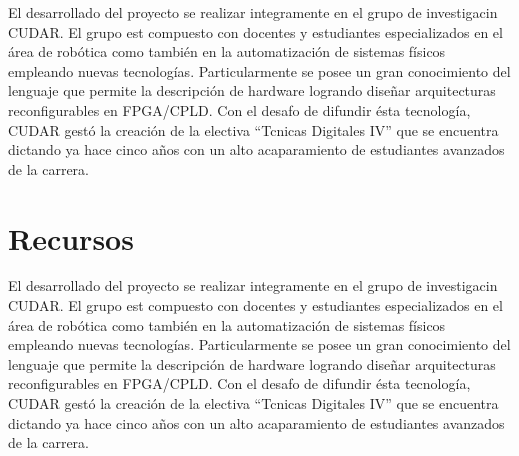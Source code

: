 \documentclass[10pt,a4paper,titlepage,spanish]{article}
\begin{document}
El desarrollado del proyecto se realizar integramente en el grupo de investigacin CUDAR. El grupo est compuesto con docentes y estudiantes especializados en el área de robótica como también en la automatización de sistemas físicos empleando nuevas tecnologías. Particularmente se posee un gran conocimiento del lenguaje que permite la descripción
de hardware logrando diseñar arquitecturas reconfigurables en FPGA/CPLD.
Con el desafo de difundir ésta tecnología, CUDAR gestó la creación de la electiva \textquotedblleft{}Tcnicas Digitales IV\textquotedblright{} que se encuentra dictando ya hace cinco años con un alto acaparamiento de estudiantes avanzados de la carrera.
\section{Recursos}

El desarrollado del proyecto se realizar integramente en el grupo de investigacin CUDAR. El grupo est compuesto con docentes y estudiantes especializados en el área de robótica como también en la automatización de sistemas físicos empleando nuevas tecnologías. Particularmente se posee un gran conocimiento del lenguaje que permite la descripción
de hardware logrando diseñar arquitecturas reconfigurables en FPGA/CPLD.
Con el desafo de difundir ésta tecnología, CUDAR gestó la creación de la electiva \textquotedblleft{}Tcnicas Digitales IV\textquotedblright{} que se encuentra dictando ya hace cinco años con un alto acaparamiento de estudiantes avanzados de la carrera.

\setlength{\footrulewidth}{0.4pt}
\end{document}
